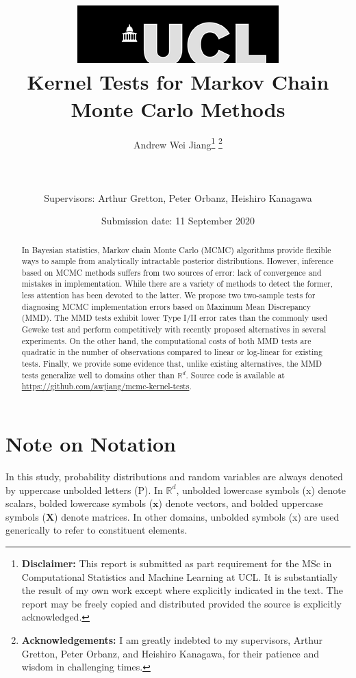 \documentclass[a4paper,11pt]{article}
\title{  	{ \includegraphics[scale=.5]{figures/ucl_logo.png}}\\
{{\Huge Kernel Tests for Markov Chain Monte Carlo Methods}}\\
		}
\date{Submission date: 11 September 2020}
\author{Andrew Wei Jiang\thanks{
{\bf Disclaimer:}
This report is submitted as part requirement for the MSc in Computational Statistics and Machine Learning at UCL. It is
substantially the result of my own work except where explicitly indicated in the text. The report may be freely copied and distributed provided the source is explicitly acknowledged.
\newline}
\thanks{
{\bf Acknowledgements:}
I am greatly indebted to my supervisors, Arthur Gretton, Peter Orbanz, and Heishiro Kanagawa, for their patience and wisdom in challenging times.
\newline}
\\ \\
\\ \\
Supervisors: Arthur Gretton, Peter Orbanz, Heishiro Kanagawa}
\begin{document}
\maketitle
\thispagestyle{empty}
\onehalfspacing

\newpage
\begin{abstract}
    In Bayesian statistics, Markov chain Monte Carlo (MCMC) algorithms provide flexible ways to sample from analytically intractable posterior distributions. However, inference based on MCMC methods suffers from two sources of error: lack of convergence and mistakes in implementation. While there are a variety of methods to detect the former, less attention has been devoted to the latter. We propose two two-sample tests for diagnosing MCMC implementation errors based on Maximum Mean Discrepancy (MMD). The MMD tests exhibit lower Type I/II error rates than the commonly used Geweke test \cite{geweke_getting_2004} and perform competitively with recently proposed alternatives in several experiments. On the other hand, the computational costs of both MMD tests are quadratic in the number of observations compared to linear or log-linear for existing tests. Finally, we provide some evidence that, unlike existing alternatives, the MMD tests generalize well to domains other than $\mathbb{R}^{d}$. Source code is available at \url{https://github.com/awjiang/mcmc-kernel-tests}.
\end{abstract}
\setcounter{page}{1}
\newpage

\tableofcontents
\newpage

\section*{Note on Notation}
In this study, probability distributions and random variables are always denoted by uppercase unbolded letters (P). In $\mathbb{R}^{d}$, unbolded lowercase symbols (x) denote scalars, bolded lowercase symbols ($\mathbf{x}$) denote vectors, and bolded uppercase symbols ($\mathbf{X}$) denote matrices. In other domains, unbolded symbols (x) are used generically to refer to constituent elements.

\newpage
\end{document}
